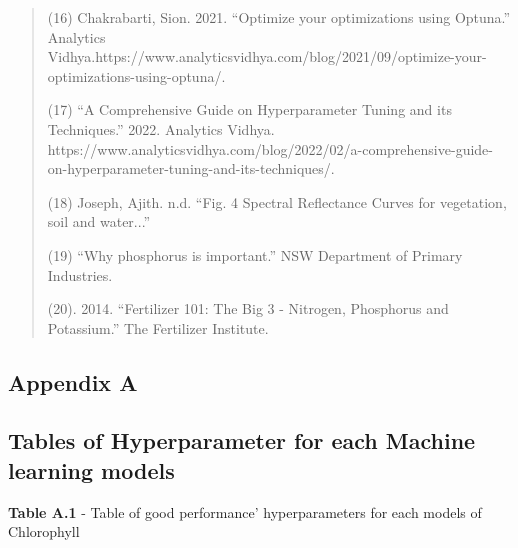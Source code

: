 \documentclass[
]{article}
\begin{document}
\begin{quote}
(16) Chakrabarti, Sion. 2021. ``Optimize your optimizations using
Optuna.'' Analytics
Vidhya.https://www.analyticsvidhya.com/blog/2021/09/optimize-your-optimizations-using-optuna/.

(17) ``A Comprehensive Guide on Hyperparameter Tuning and its
Techniques.'' 2022. Analytics Vidhya.
https://www.analyticsvidhya.com/blog/2022/02/a-comprehensive-guide-on-hyperparameter-tuning-and-its-techniques/.

(18) Joseph, Ajith. n.d. ``Fig. 4 Spectral Reflectance Curves for
vegetation, soil and water...''

(19) ``Why phosphorus is important.'' NSW Department of Primary
Industries.

(20). 2014. ``Fertilizer 101: The Big 3 - Nitrogen, Phosphorus and
Potassium.'' The Fertilizer Institute.
\end{quote}

\hypertarget{appendix-a}{%
\subsection{\texorpdfstring{\textbf{Appendix
A}}{Appendix A}}\label{appendix-a}}

\hypertarget{tables-of-hyperparameter-for-each-machine-learning-models}{%
\subsection{\texorpdfstring{\textbf{Tables of Hyperparameter for each
Machine learning
models}}{Tables of Hyperparameter for each Machine learning models}}\label{tables-of-hyperparameter-for-each-machine-learning-models}}

\textbf{Table A.1} - Table of good performance' hyperparameters for each
models of Chlorophyll
\end{document}
